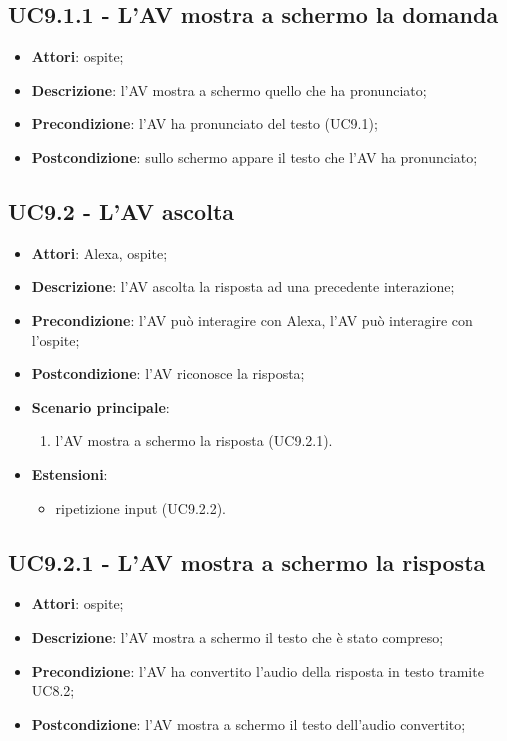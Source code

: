 \documentclass[../AnalisiDeiRequisiti.tex]{subfiles}
\begin{document}
\subsection{UC9.1.1 - L'AV mostra a schermo la domanda} 
\label{sssec:UC9.1.1} 
\begin{itemize} 
\item \textbf{Attori}: ospite;
\item \textbf{Descrizione}: l'AV mostra a schermo quello che ha pronunciato;
\item \textbf{Precondizione}: l'AV ha pronunciato del testo (UC9.1);
\item \textbf{Postcondizione}: sullo schermo appare il testo che l'AV ha pronunciato;
\end{itemize} 
\subsection{UC9.2 - L'AV ascolta} 
\label{sssec:UC9.2} 
\begin{itemize} 
\item \textbf{Attori}: Alexa, ospite;
\item \textbf{Descrizione}: l'AV ascolta la risposta ad una precedente interazione;
\item \textbf{Precondizione}: l'AV può interagire con Alexa, l'AV può interagire con l'ospite;
\item \textbf{Postcondizione}: l'AV riconosce la risposta;
\item \textbf{Scenario principale}: \begin{enumerate}\item l'AV mostra a schermo la risposta (UC9.2.1). 
 \end{enumerate}
\item \textbf{Estensioni}:\begin{itemize}\item ripetizione input (UC9.2.2).\end{itemize}
\end{itemize} 
\subsection{UC9.2.1 - L'AV mostra a schermo la risposta} 
\label{sssec:UC9.2.1} 
\begin{itemize} 
\item \textbf{Attori}: ospite;
\item \textbf{Descrizione}: l'AV mostra a schermo il testo che è stato compreso;
\item \textbf{Precondizione}: l'AV ha convertito l'audio della risposta in testo tramite UC8.2;
\item \textbf{Postcondizione}: l'AV mostra a schermo il testo dell'audio convertito;
\end{itemize} 
\end{document}
